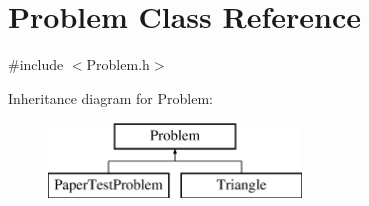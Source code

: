 \hypertarget{classProblem}{}\section{Problem Class Reference}
\label{classProblem}


{\ttfamily \#include $<$Problem.\+h$>$}

Inheritance diagram for Problem\+:\begin{figure}[H]
\begin{center}
\leavevmode
\includegraphics[height=2.000000cm]{classProblem}
\end{center}
\end{figure}
